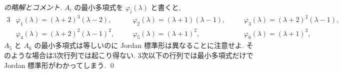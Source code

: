\documentclass[12pt,twoside]{jarticle}
\begin{document}
\begin{proof}[\protect{[158]}の略解とコメント]
\medskip{}
$A_i$ の最小多項式を $\varphi_i(\lambda)$ と書くと,
{\small
\begin{alignat*}{3}
  &
  \varphi_1(\lambda) = (\lambda+2)^3(\lambda-2),
  & \quad &
  \varphi_2(\lambda) = (\lambda+1)(\lambda-1),
  & \quad &
  \varphi_3(\lambda) = (\lambda+2)^2(\lambda-1),
  \\ &
  \varphi_4(\lambda) = (\lambda+2)^2(\lambda-1)^2,
  & \quad &
  \varphi_5(\lambda) = (\lambda+1)^2,
  & \quad &
  \varphi_6(\lambda) = (\lambda+1)^2,
\end{alignat*}
}$A_5$ と $A_6$ の最小多項式は等しいのに Jordan 標準形は異なることに注意せよ.
そのような場合は3次行列では起こり得ない. 3次以下の行列では最小多項式だけで 
Jordan 標準形がわかってしまう.
\qed
\end{proof}

\end{document}

